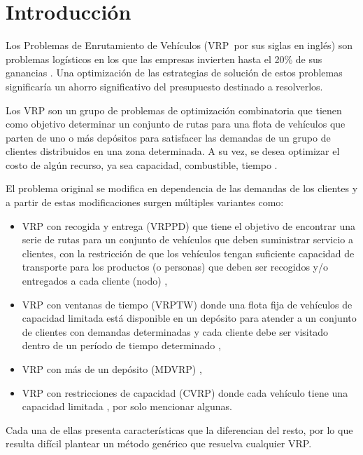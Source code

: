 \chapter*{Introducción}\label{chapter:introduction}

\qquad 
Los Problemas de Enrutamiento de Vehículos (VRP~por sus siglas en inglés) son problemas logísticos en los que las empresas invierten hasta el 20\% de sus ganancias \cite{Toth}. Una optimización de las estrategias de solución de estos problemas significaría un ahorro significativo del presupuesto destinado a resolverlos. 

Los VRP son un grupo de problemas de optimización combinatoria que tienen como objetivo determinar un conjunto de rutas para una flota de vehículos que parten de uno o más depósitos para satisfacer las demandas de un grupo de clientes distribuidos en una zona determinada. A su vez, se desea optimizar el costo de algún recurso, ya sea capacidad, combustible, tiempo \cite{Hillier}.

El problema original se modifica en dependencia de las demandas de los clientes y a partir de estas modificaciones surgen múltiples variantes como: 
\begin{itemize}
	\item VRP con recogida y entrega (VRPPD) que tiene el objetivo de encontrar una serie de rutas para un conjunto de vehículos que deben suministrar servicio a clientes, con la restricción de que los vehículos tengan suficiente capacidad de transporte para los productos (o personas) que deben ser recogidos y/o entregados a cada cliente (nodo) \cite{PedroP},

    \item VRP con ventanas de tiempo (VRPTW) donde una flota fija de vehículos de capacidad limitada está disponible en un depósito para atender a un conjunto de clientes con demandas determinadas y cada cliente debe ser visitado dentro de un período de tiempo determinado \cite{Kolen}, 
	\item VRP con más de un depósito (MDVRP) \cite{Bayir, Alemany}, 
	\item VRP con restricciones de capacidad (CVRP) donde cada vehículo tiene una capacidad limitada \cite{Alemany}, por solo mencionar algunas. 
\end{itemize}
	Cada una de ellas presenta características que la diferencian del resto, por lo que resulta difícil plantear un método genérico que resuelva cualquier VRP\@.

